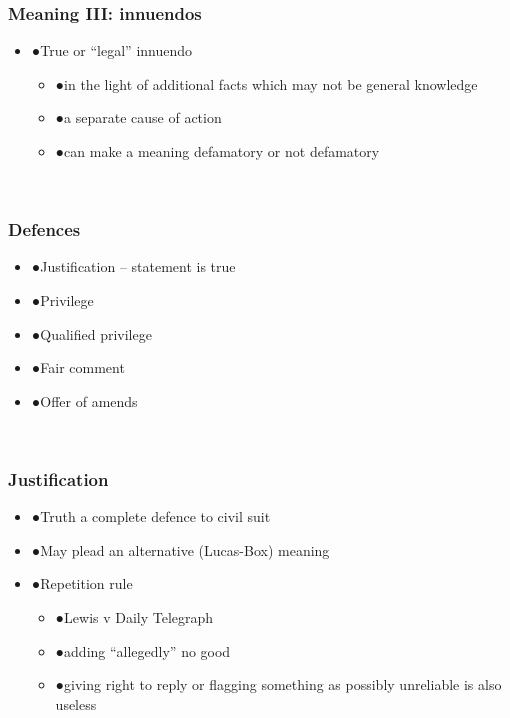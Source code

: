 \documentclass[ignorenonframetext,]{beamer}
\begin{document}
\begin{frame}
\frametitle{Meaning III: innuendos}

\begin{itemize}
\item  {●}True or ``legal'' innuendo

  \begin{itemize}
  \item    {●}in the light of additional facts which may not be general
    knowledge
  \item    {●}a separate cause of action
  \item    {●}can make a meaning defamatory or not defamatory
  \end{itemize}
\end{itemize}

~


\end{frame}

\begin{frame}
\frametitle{Defences}

\begin{itemize}
\item  {●}Justification -- statement is true
\item  {●}Privilege
\item  {●}Qualified privilege
\item  {●}Fair comment
\item  {●}Offer of amends
\end{itemize}

~


\end{frame}

\begin{frame}
\frametitle{Justification}

\begin{itemize}
\item  {●}Truth a complete defence to civil suit
\item  {●}May plead an alternative ({Lucas-Box}{) meaning}
\item  {●}Repetition rule

  \begin{itemize}
  \item    {●}Lewis v Daily Telegraph
  \item    {●}adding ``allegedly'' no good
  \item    {●}giving right to reply or flagging something as possibly
    unreliable is also useless
  \end{itemize}
\end{itemize}

~


\end{frame}
\end{document}
